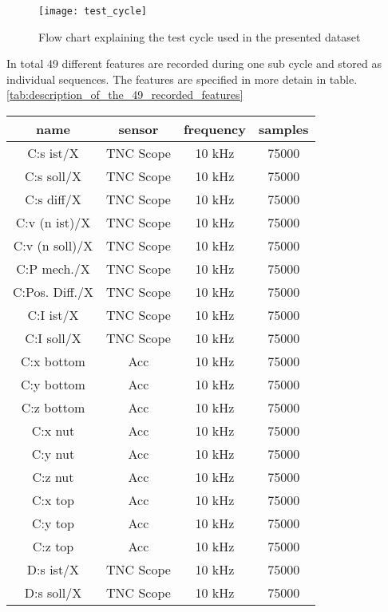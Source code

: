 \begin{figure}[H]
  \centering
  \texttt{[image: test\_cycle]}
  \caption {Flow chart explaining the test cycle used in the presented dataset}
  \label{fig:test_cycle}
\end{figure}

In total 49 different features are recorded during one sub cycle and stored as individual sequences. The features are specified in more detain in table. \ref{tab:description_of_the_49_recorded_features}

\begin{center}
\begin{longtable}{||c c c c||} 
 \hline
 name & sensor & frequency & samples \\ [0.5ex] 
 \hline\hline
 C:s ist/X & TNC Scope & 10 kHz & 75000 \\ 
 \hline
 C:s soll/X & TNC Scope & 10 kHz & 75000 \\ 
 \hline
 C:s diff/X & TNC Scope & 10 kHz & 75000 \\ 
 \hline
 C:v (n ist)/X & TNC Scope & 10 kHz & 75000 \\ 
 \hline
 C:v (n soll)/X& TNC Scope & 10 kHz & 75000 \\ 
 \hline
 C:P mech./X & TNC Scope & 10 kHz & 75000 \\ 
 \hline
 C:Pos. Diff./X & TNC Scope & 10 kHz & 75000 \\ 
 \hline
 C:I ist/X & TNC Scope & 10 kHz & 75000 \\ 
  \hline
 C:I soll/X & TNC Scope & 10 kHz & 75000 \\ 
 \hline
 C:x bottom & Acc & 10 kHz & 75000 \\ 
 \hline
 C:y bottom & Acc & 10 kHz & 75000 \\ 
 \hline
 C:z bottom & Acc & 10 kHz & 75000 \\ 
 \hline
 C:x nut & Acc & 10 kHz & 75000 \\ 
 \hline
 C:y nut & Acc & 10 kHz & 75000 \\ 
 \hline
 C:z nut & Acc & 10 kHz & 75000 \\ 
 \hline
  C:x top & Acc & 10 kHz & 75000 \\ 
 \hline
 C:y top & Acc & 10 kHz & 75000 \\ 
 \hline
 C:z top & Acc & 10 kHz & 75000 \\ 
 \hline
 D:s ist/X & TNC Scope & 10 kHz & 75000 \\
 \hline
 D:s soll/X & TNC Scope & 10 kHz & 75000 \\ 
 \hline

\end{longtable}
\end{center}
